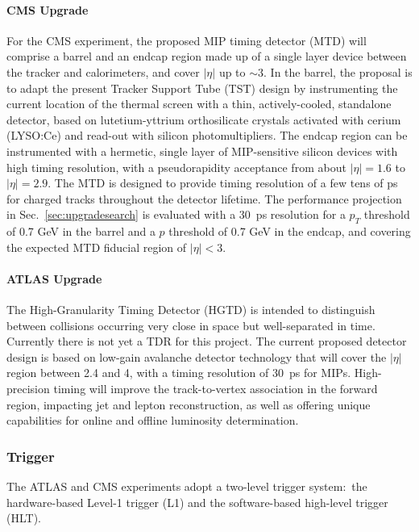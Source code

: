 \paragraph{CMS Upgrade}

For the CMS experiment, the proposed MIP timing detector (MTD) will comprise a barrel and an endcap region made up of a single layer device between the tracker and calorimeters, and cover $|\eta|$ up to $\sim3$. In the barrel, the proposal is to adapt the present Tracker Support Tube (TST) design by instrumenting the current location of the thermal screen with a thin, actively-cooled, standalone detector, based on lutetium-yttrium orthosilicate crystals activated with cerium (LYSO:Ce) and read-out with silicon photomultipliers. The endcap region can be instrumented with a hermetic, single layer of MIP-sensitive silicon devices with high timing resolution, with a pseudorapidity acceptance from about $|\eta|=1.6$ to $|\eta|=2.9$. The MTD is designed to provide timing resolution of a few tens of ps for charged tracks throughout the detector lifetime. The performance projection in Sec.~\ref{sec:upgradesearch} is evaluated with a 30~ps resolution for a $p_T$ threshold of 0.7 GeV in the barrel and a $p$ threshold of 0.7 GeV in the endcap, and covering the expected MTD fiducial region of $|\eta| < 3$.

\paragraph{ATLAS Upgrade}

The High-Granularity Timing Detector (HGTD) is intended to distinguish between collisions occurring very close in space but well-separated in time. Currently there is not yet a TDR for this project. The current proposed detector design is based on low-gain avalanche detector technology that will cover the $|\eta|$ region between 2.4 and 4,
with a timing resolution of 30~ps for MIPs. High-precision timing will improve the track-to-vertex association in the forward region, impacting jet and lepton reconstruction, as well as offering unique capabilities for online and offline luminosity determination.

\subsubsection{Trigger} \label{sec:upgradetrigger}

The ATLAS and CMS experiments adopt a two-level trigger system:~the hardware-based Level-1 trigger (L1) and the software-based high-level trigger (HLT). %

